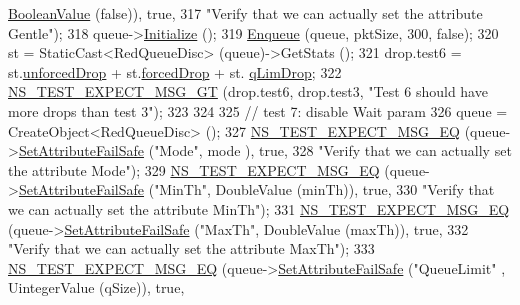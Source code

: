 \begin{DoxyCode}
      \hyperlink{classns3_1_1BooleanValue}{BooleanValue} (\textcolor{keyword}{false})), \textcolor{keyword}{true},
317                          \textcolor{stringliteral}{"Verify that we can actually set the attribute Gentle"});
318   queue->\hyperlink{classns3_1_1Object_af4411cb29971772fcd09203474a95078}{Initialize} ();
319   \hyperlink{classRedQueueDiscTestCase_a231b433374e4485d83bcca3088685e31}{Enqueue} (queue, pktSize, 300, \textcolor{keyword}{false});
320   st = StaticCast<RedQueueDisc> (queue)->GetStats ();
321   drop.test6 = st.\hyperlink{structns3_1_1RedQueueDisc_1_1Stats_a242027f6eb7d30e2cd636c52080e2c73}{unforcedDrop} + st.\hyperlink{structns3_1_1RedQueueDisc_1_1Stats_a56951fa215564c8d2e59aa046dc3e494}{forcedDrop} + st.
      \hyperlink{structns3_1_1RedQueueDisc_1_1Stats_a2374b8b8386ad6e42435bf1b29109bad}{qLimDrop};
322   \hyperlink{group__testing_ga6ba43672d44c1e85acfb1daf2af66612}{NS\_TEST\_EXPECT\_MSG\_GT} (drop.test6, drop.test3, \textcolor{stringliteral}{"Test 6 should have more drops than
       test 3"});
323 
324 
325   \textcolor{comment}{// test 7: disable Wait param}
326   queue = CreateObject<RedQueueDisc> ();
327   \hyperlink{group__testing_ga7304ba46a28d8cf08dfdfd6499cf7068}{NS\_TEST\_EXPECT\_MSG\_EQ} (queue->\hyperlink{classns3_1_1ObjectBase_aa7d333004e970f925a4ed5df275541b5}{SetAttributeFailSafe} (\textcolor{stringliteral}{"Mode"}, mode
      ), \textcolor{keyword}{true},
328                          \textcolor{stringliteral}{"Verify that we can actually set the attribute Mode"});
329   \hyperlink{group__testing_ga7304ba46a28d8cf08dfdfd6499cf7068}{NS\_TEST\_EXPECT\_MSG\_EQ} (queue->\hyperlink{classns3_1_1ObjectBase_aa7d333004e970f925a4ed5df275541b5}{SetAttributeFailSafe} (\textcolor{stringliteral}{"MinTh"}, 
      DoubleValue (minTh)), \textcolor{keyword}{true},
330                          \textcolor{stringliteral}{"Verify that we can actually set the attribute MinTh"});
331   \hyperlink{group__testing_ga7304ba46a28d8cf08dfdfd6499cf7068}{NS\_TEST\_EXPECT\_MSG\_EQ} (queue->\hyperlink{classns3_1_1ObjectBase_aa7d333004e970f925a4ed5df275541b5}{SetAttributeFailSafe} (\textcolor{stringliteral}{"MaxTh"}, 
      DoubleValue (maxTh)), \textcolor{keyword}{true},
332                          \textcolor{stringliteral}{"Verify that we can actually set the attribute MaxTh"});
333   \hyperlink{group__testing_ga7304ba46a28d8cf08dfdfd6499cf7068}{NS\_TEST\_EXPECT\_MSG\_EQ} (queue->\hyperlink{classns3_1_1ObjectBase_aa7d333004e970f925a4ed5df275541b5}{SetAttributeFailSafe} (\textcolor{stringliteral}{"QueueLimit"}
      , UintegerValue (qSize)), \textcolor{keyword}{true},

\end{DoxyCode}
